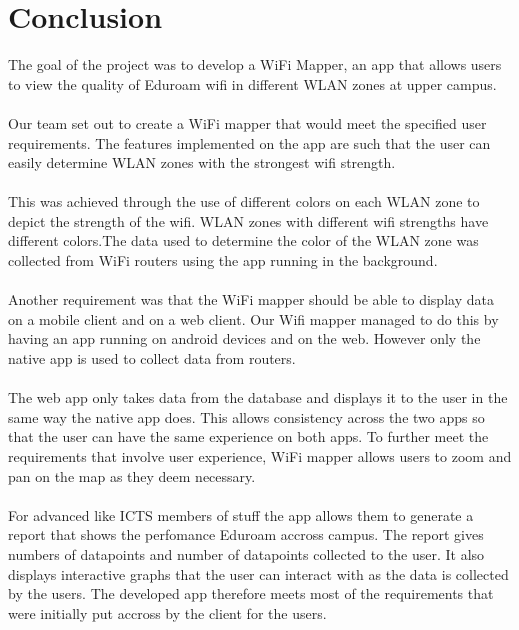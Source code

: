 \section{Conclusion}
The goal of the project  was to develop a WiFi Mapper, an app that allows users to view the quality of Eduroam wifi in different WLAN zones at upper campus.

\paragraph{}Our team set out to create a WiFi mapper that would meet the specified user requirements. The features implemented on the app are such that the user can easily determine WLAN zones with the strongest wifi strength.

\paragraph{}This was achieved through the use of different colors on each WLAN zone to depict the strength of the wifi. WLAN zones with different wifi strengths have different colors.The data used to determine the color of the WLAN zone was collected from WiFi routers using the app running in the background.

\paragraph{}Another requirement was that the WiFi mapper should be able to display data on a mobile client and on a web client. Our Wifi mapper managed to do this by having an app running on android devices and on the web. However only the native app is used to collect data from routers.

\paragraph{}The web app only takes data from the database and displays it to the user in the same way the native app does. This allows consistency across the two apps so that the user can have the same experience on both apps. To further meet the requirements that involve user experience, WiFi mapper allows users to zoom and pan on the map as they deem necessary. 

\paragraph{}For advanced like ICTS members of stuff the app allows them to generate a report that shows the perfomance Eduroam accross campus. The report gives numbers of datapoints and number of datapoints collected to the user. It also displays interactive graphs that the user can interact with as the data is collected by the users. The developed app therefore meets most of the requirements that were initially put accross by the client for the users.

